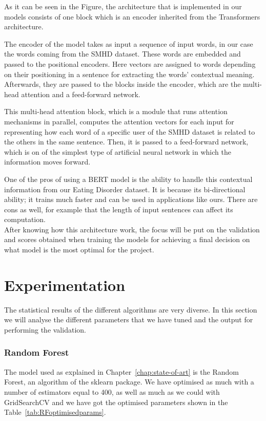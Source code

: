 As it can be seen in the Figure, the architecture that is implemented in our models consists of one block which is an encoder inherited from the Transformers architecture.

The encoder of the model takes as input a sequence of input words, in our case the words coming from the SMHD dataset. These words are embedded and passed to the positional encoders. Here vectors are assigned to words depending on their positioning in a sentence for extracting the words' contextual meaning. Afterwards, they are passed to the blocks inside the encoder, which are the multi-head attention and a feed-forward network.  

This multi-head attention block, which is a module that runs attention mechanisms in parallel, computes the attention vectors for each input for representing how each word of a specific user of the SMHD dataset is related to the others in the same sentence. Then, it is passed to a feed-forward network, which is on of the simplest type of artificial neural network in which the information moves forward.

One of the pros of using a BERT model is the ability to handle this contextual information from our Eating Disorder dataset. It is because its bi-directional ability; it trains much faster and can be used in applications like ours. There are cons as well, for example that the length of input sentences can affect its computation. \\

After knowing how this architecture work, the focus will be put on the validation and scores obtained when training the models for achieving a final decision on what model is the most optimal for the project.

\section{Experimentation}
The statistical results of the different algorithms are very diverse. In this section we will analyse the different parameters that we have tuned and the output for performing the validation.

\subsubsection{Random Forest}
The model used as explained in Chapter~\ref{chap:state-of-art} is the Random Forest, an algorithm of the sklearn package. We have optimised as much with a number of estimators equal to 400, as well as much as we could with GridSearchCV and we have got the optimised parameters shown in the Table~\ref{tab:RFoptimisedparams}.


